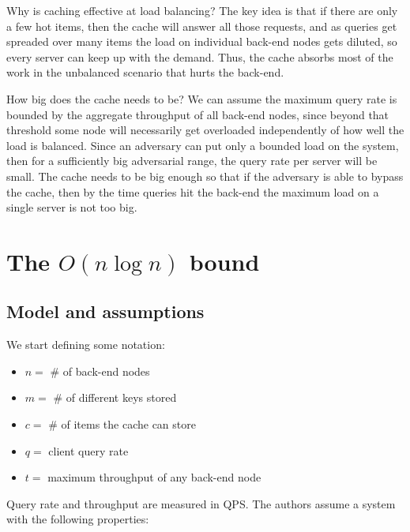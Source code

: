 \documentclass[10pt,letterpaper]{article}
\begin{document}
Why is caching effective at load balancing? The key idea is that if there are only a few hot items, then the cache will answer all those requests, and as queries get spreaded over many items the load on individual back-end nodes gets diluted, so every server can keep up with the demand. Thus, the cache absorbs most of the work in the unbalanced scenario that hurts the back-end.

How big does the cache needs to be? We can assume the maximum query rate is bounded by the aggregate throughput of all back-end nodes, since beyond that threshold some node will necessarily get overloaded independently of how well the load is balanced. Since an adversary can put only a bounded load on the system, then for a sufficiently big adversarial range, the query rate per server will be small. The cache needs to be big enough so that if the adversary is able to bypass the cache, then by the time queries hit the back-end the maximum load on a single server is not too big.

\section{The $O(n \log n)$ bound}
\label{sec:bound}

\subsection{Model and assumptions}

We start defining some notation:

\begin{itemize}
	\item[] $n = $ \# of back-end nodes
	\item[] $m = $ \# of different keys stored
	\item[] $c = $ \# of items the cache can store
	\item[] $q = $ client query rate
	\item[] $t = $ maximum throughput of any back-end node
\end{itemize}

\noindent
Query rate and throughput are measured in QPS. The authors assume a system with the following properties:
\end{document}
